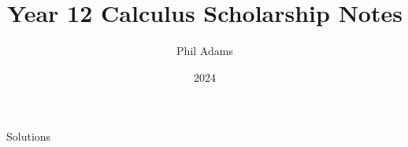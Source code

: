\documentclass[12pt, letterpaper]{article}
\title{Year 12 Calculus Scholarship Notes}
\author{Phil Adams}
\date{2024}
\begin{document}
\maketitle

\pagebreak

\tableofcontents
\setlength{\parskip}{10pt}
\pagebreak

\pagebreak

\pagebreak

\pagebreak

\pagebreak

\pagebreak

\pagebreak

\pagebreak

\pagebreak

\pagebreak

\pagebreak

\pagebreak



\pagebreak
{}
\begin{center}
    \huge
    Solutions
    \normalsize
\end{center}
\restoregeometry

\pagebreak

\pagebreak

\pagebreak

\pagebreak

\pagebreak

\pagebreak

\pagebreak

\pagebreak

\pagebreak

\pagebreak

\pagebreak

\end{document}
